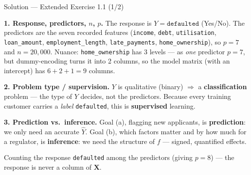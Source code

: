 \documentclass[aspectratio=169,11pt]{beamer}
\begin{document}
\begin{frame}{Solution --- Extended Exercise 1.1 (1/2)}
\begin{solutionbox}
\textbf{1. Response, predictors, $n$, $p$.} The response is $Y=\texttt{defaulted}$ (Yes/No). The predictors are the seven recorded features (\texttt{income}, \texttt{debt}, \texttt{utilisation}, \texttt{loan\_amount}, \texttt{employment\_length}, \texttt{late\_payments}, \texttt{home\_ownership}), so $p=7$ and $n=20{,}000$. Nuance: \texttt{home\_ownership} has 3 levels --- as \emph{one} predictor $p=7$, but dummy-encoding turns it into 2 columns, so the model matrix (with an intercept) has $6+2+1=9$ columns.

\textbf{2. Problem type / supervision.} $Y$ is qualitative (binary) $\Rightarrow$ a \textbf{classification} problem --- the type of $Y$ decides, not the predictors. Because every training customer carries a \emph{label} \texttt{defaulted}, this is \textbf{supervised} learning.

\textbf{3. Prediction vs.\ inference.} Goal (a), flagging new applicants, is \textbf{prediction}: we only need an accurate $\hat Y$. Goal (b), which factors matter and by how much for a regulator, is \textbf{inference}: we need the structure of $f$ --- signed, quantified effects.
\end{solutionbox}
\begin{mistake}
Counting the response \texttt{defaulted} among the predictors (giving $p=8$) --- the response is never a column of $\mathbf X$.
\end{mistake}
\end{frame}
\end{document}
